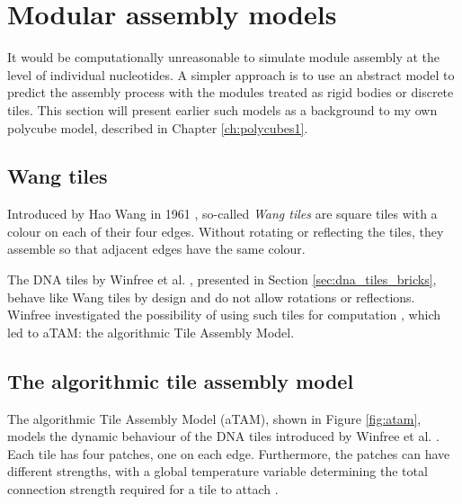 \section{Modular assembly models}
It would be computationally unreasonable to simulate module assembly at the level of individual nucleotides. A simpler approach is to use an abstract model to predict the assembly process with the modules treated as rigid bodies or discrete tiles. This section will present earlier such models as a background to my own polycube model, described in Chapter \ref{ch:polycubes1}.

\subsection{Wang tiles}
Introduced by Hao Wang in 1961 \cite{wang1961proving}, so-called \emph{Wang tiles} are square tiles with a colour on each of their four edges. Without rotating or reflecting the tiles, they assemble so that adjacent edges have the same colour.


The DNA tiles by Winfree et al. \cite{winfree1998design}, presented in Section \ref{sec:dna_tiles_bricks}, behave like Wang tiles by design and do not allow rotations or reflections. Winfree investigated the possibility of using such tiles for computation \cite{winfree1998algorithmic}, which led to aTAM: the algorithmic Tile Assembly Model.

\subsection{The algorithmic tile assembly model}
\label{sec:atam}


The algorithmic Tile Assembly Model (aTAM), shown in Figure \ref{fig:atam}, models the dynamic behaviour of the DNA tiles introduced by Winfree et al. \cite{winfree1998design}. Each tile has four patches, one on each edge. Furthermore, the patches can have different strengths, with a global temperature variable determining the total connection strength required for a tile to attach \cite{doty2012theory}.

